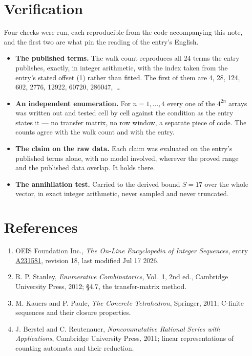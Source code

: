 \documentclass[11pt]{article}
\theoremstyle{definition}
\begin{document}
\section{Verification}

Four checks were run, each reproducible from the code accompanying this note, and the first two are what pin the reading of the entry's English.

\begin{itemize}

\item {\bfseries The published terms.} The walk count reproduces all 24 terms the entry publishes, exactly, in integer arithmetic, with the index taken from the entry's stated offset (1) rather than fitted. The first of them are 4, 28, 124, 602, 2776, 12922, 60720, 286047,~\dots

\item {\bfseries An independent enumeration.} For $n = 1,\dots,4$ every one of the $4^{2n}$ arrays was written out and tested cell by cell against the condition as the entry states it --- no transfer matrix, no row window, a separate piece of code. The counts agree with the walk count and with the entry.

\item {\bfseries The claim on the raw data.} Each claim was evaluated on the entry's published terms alone, with no model involved, wherever the proved range and the published data overlap. It holds there.

\item {\bfseries The annihilation test.} Carried to the derived bound $S = 17$ over the whole vector, in exact integer arithmetic, never sampled and never truncated.

\end{itemize}

\section{References}

\begin{enumerate}

\item OEIS Foundation Inc., \emph{The On-Line Encyclopedia of Integer Sequences}, entry \href{https://oeis.org/A231581}{A231581}, revision 18, last modified Jul 17 2026.

\item R. P. Stanley, \emph{Enumerative Combinatorics}, Vol.~1, 2nd ed., Cambridge University Press, 2012; \S4.7, the transfer-matrix method.

\item M. Kauers and P. Paule, \emph{The Concrete Tetrahedron}, Springer, 2011; C-finite sequences and their closure properties.

\item J. Berstel and C. Reutenauer, \emph{Noncommutative Rational Series with Applications}, Cambridge University Press, 2011; linear representations of counting automata and their reduction.

\end{enumerate}
\end{document}
